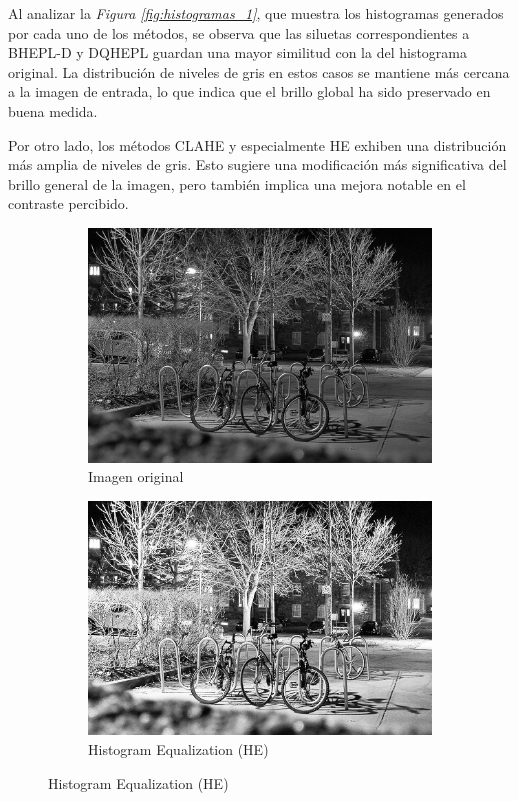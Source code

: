 \documentclass[sigchi]{acmart}
\begin{document}
Al analizar la \emph{Figura \ref{fig:histogramas_1}}, que muestra los histogramas generados por cada
uno de los métodos, se observa que las siluetas correspondientes a BHEPL-D y DQHEPL guardan una
mayor similitud con la del histograma original. La distribución de niveles de gris en estos
casos se mantiene más cercana a la imagen de entrada, lo que indica que el brillo global ha
sido preservado en buena medida.

Por otro lado, los métodos CLAHE y especialmente HE exhiben una distribución más amplia de
niveles de gris. Esto sugiere una modificación más significativa del brillo general de la
imagen, pero también implica una mejora notable en el contraste percibido.

\begin{figure}[htbp]
	\centering

	\begin{subfigure}[b]{0.32\textwidth}
		\centering
		\includegraphics[width=\linewidth]{./procesadas/2015_00002/2015_00002_original.png}
		\caption{Imagen original}
	\end{subfigure}
	\hfill
	\begin{subfigure}[b]{0.32\textwidth}
		\centering
		\includegraphics[width=\linewidth]{./procesadas/2015_00002/2015_00002_he.png}
		\caption{Histogram Equalization (HE)}
	\end{subfigure}


\end{figure}
\end{document}

